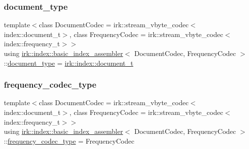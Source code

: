 \mbox{\label{classirk_1_1index_1_1basic__index__assembler_ae4f97ba949d5359dc425b034f6fc319d}} 
\subsubsection{\texorpdfstring{document\+\_\+type}{document\_type}}
{\footnotesize\ttfamily template$<$class Document\+Codec  = irk\+::stream\+\_\+vbyte\+\_\+codec$<$index\+::document\+\_\+t$>$, class Frequency\+Codec  = irk\+::stream\+\_\+vbyte\+\_\+codec$<$index\+::frequency\+\_\+t$>$$>$ \\
using \mbox{\hyperlink{classirk_1_1index_1_1basic__index__assembler}{irk\+::index\+::basic\+\_\+index\+\_\+assembler}}$<$ Document\+Codec, Frequency\+Codec $>$\+::\mbox{\hyperlink{classirk_1_1index_1_1basic__index__assembler_ae4f97ba949d5359dc425b034f6fc319d}{document\+\_\+type}} =  \mbox{\hyperlink{namespaceirk_1_1index_af829dedea20da89f9b51b49d78f57006}{irk\+::index\+::document\+\_\+t}}}

\mbox{\label{classirk_1_1index_1_1basic__index__assembler_a2a415182287d7c48e7c6bf8d0c70a06f}} 
\subsubsection{\texorpdfstring{frequency\+\_\+codec\+\_\+type}{frequency\_codec\_type}}
{\footnotesize\ttfamily template$<$class Document\+Codec  = irk\+::stream\+\_\+vbyte\+\_\+codec$<$index\+::document\+\_\+t$>$, class Frequency\+Codec  = irk\+::stream\+\_\+vbyte\+\_\+codec$<$index\+::frequency\+\_\+t$>$$>$ \\
using \mbox{\hyperlink{classirk_1_1index_1_1basic__index__assembler}{irk\+::index\+::basic\+\_\+index\+\_\+assembler}}$<$ Document\+Codec, Frequency\+Codec $>$\+::\mbox{\hyperlink{classirk_1_1index_1_1basic__index__assembler_a2a415182287d7c48e7c6bf8d0c70a06f}{frequency\+\_\+codec\+\_\+type}} =  Frequency\+Codec}

